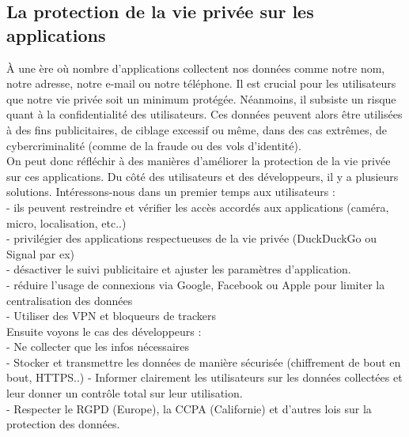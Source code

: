 \documentclass{article}
\begin{document}
\subsection{La protection de la vie privée sur les applications}
À une ère où nombre d'applications collectent nos données  comme notre nom, notre adresse, notre e-mail ou notre téléphone. Il est crucial pour les utilisateurs que notre vie privée soit un minimum protégée. Néanmoins, il subsiste un risque quant à la confidentialité des utilisateurs. Ces données peuvent alors être utilisées à des fins publicitaires, de ciblage excessif ou même, dans des cas extrêmes, de cybercriminalité (comme de la fraude ou des vols d'identité).\\
On peut donc réfléchir à des manières d'améliorer la protection de la vie privée sur ces applications. Du côté des utilisateurs et des développeurs, il y a plusieurs solutions. Intéressons-nous dans un premier temps aux utilisateurs :\\
- ils peuvent restreindre et vérifier les accès accordés aux applications (caméra, micro, localisation, etc..)\\
- privilégier des applications respectueuses de la vie privée (DuckDuckGo ou Signal par ex)\\
- désactiver le suivi publicitaire et ajuster les paramètres d'application.\\
- réduire l'usage de connexions via Google, Facebook ou Apple pour limiter la centralisation des données \\
- Utiliser des VPN et bloqueurs de trackers\\
Ensuite voyons le cas des développeurs : \\
- Ne collecter que les infos nécessaires \\
- Stocker et transmettre les données de manière sécurisée (chiffrement de bout en bout, HTTPS..)
- Informer clairement les utilisateurs sur les données collectées et leur donner un contrôle total sur leur utilisation. \\
- Respecter le RGPD (Europe), la CCPA (Californie) et d’autres lois sur la protection des données.
\end{document}
